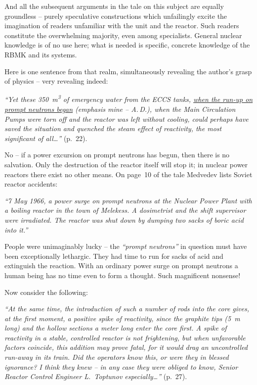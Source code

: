 \documentclass[openright]{bookest}
\begin{document}
And all the subsequent arguments in the tale on this subject are equally groundless -- purely speculative constructions which unfailingly excite the imagination of readers unfamiliar with the unit and the reactor. Such readers constitute the overwhelming majority, even among specialists. General nuclear knowledge is of no use here; what is needed is specific, concrete knowledge of the RBMK and its systems.

Here is one sentence from that realm, simultaneously revealing the author's grasp of physics -- very revealing indeed:

\begin{personal}
\textit{``Yet these \qty{350}{\metre\cubed} of emergency water from the ECCS tanks, \ul{when the run-up on prompt neutrons began} (emphasis mine -- A.\,D.), when the Main Circulation Pumps were torn off and the reactor was left without cooling, could perhaps have saved the situation and quenched the steam effect of reactivity, the most significant of all\ldots''} (p.~22).
\end{personal}

No -- if a power excursion on prompt neutrons has begun, then there is no salvation. Only the destruction of the reactor itself will stop it; in nuclear power reactors there exist no other means. On page~10 of the tale Medvedev lists Soviet reactor accidents: 

\begin{personal}
\textit{``7 May 1966, a power surge on prompt neutrons at the Nuclear Power Plant with a boiling reactor in the town of Melekess. A dosimetrist and the shift supervisor were irradiated. The reactor was shut down by dumping two sacks of boric acid into it.''}
\end{personal}

People were unimaginably lucky -- the \textit{``prompt neutrons''} in question must have been exceptionally lethargic. They had time to run for sacks of acid and extinguish the reaction. With an ordinary power surge on prompt neutrons a human being has no time even to form a thought. Such magnificent nonsense!

Now consider the following:

\begin{personal}
\textit{``At the same time, the introduction of such a number of rods into the core gives, at the first moment, a positive spike of reactivity, since the graphite tips (\qty{5}{\metre} long) and the hollow sections a meter long enter the core first. A spike of reactivity in a stable, controlled reactor is not frightening, but when unfavorable factors coincide, this addition may prove fatal, for it would drag an uncontrolled run-away in its train. Did the operators know this, or were they in blessed ignorance? I think they knew -- in any case they were obliged to know, Senior Reactor Control Engineer L.~Toptunov especially\ldots''} (p.~27).
\end{personal}
\end{document}
